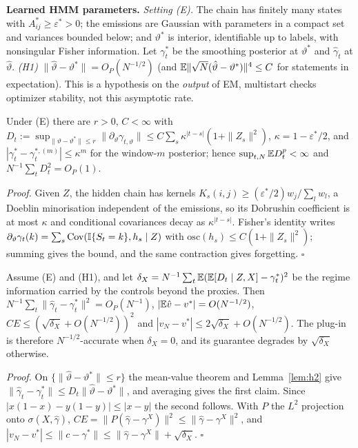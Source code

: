 \textbf{Learned HMM parameters.}
\emph{Setting (E).} The chain has finitely many states with $A^*_{ij}\ge\varepsilon^*>0$; the emissions are Gaussian with parameters in a compact set and variances bounded below; and $\vartheta^*$ is interior, identifiable up to labels, with nonsingular Fisher information. Let $\gamma^*_t$ be the smoothing posterior at $\vartheta^*$ and $\hat\gamma_t$ at $\hat\vartheta$. \emph{(H1)} $\|\hat\vartheta-\vartheta^*\|=O_P(N^{-1/2})$ (and $\mathbb{E}\|\sqrt N(\hat\vartheta-\vartheta^*)\|^4\le C$ for statements in expectation). This is a hypothesis on the \emph{output} of EM, multistart checks optimizer stability, not this asymptotic rate.
\begin{lemma}\label{lem:h2}
Under (E) there are $r>0$, $C<\infty$ with $D_t:=\sup_{\|\vartheta-\vartheta^*\|\le r}\|\partial_\vartheta\gamma_{t,\vartheta}\|\le C\sum_s\kappa^{|t-s|}(1+\|Z_s\|^2)$, $\kappa=1-\varepsilon^*/2$, and $|\gamma^*_t-\gamma^{*,(m)}_t|\le\kappa^m$ for the window-$m$ posterior; hence $\sup_{t,N}\mathbb{E} D_t^p<\infty$ and $N^{-1}\sum_tD_t^2=O_P(1)$.
\end{lemma}
\emph{Proof.} Given $Z$, the hidden chain has kernels $K_s(i,j)\ge(\varepsilon^*/2)w_j/\sum_lw_l$, a Doeblin minorisation independent of the emissions, so its Dobrushin coefficient is at most $\kappa$ and conditional covariances decay as $\kappa^{|t-s|}$. Fisher's identity writes $\partial_\vartheta\gamma_t(k)=\sum_s\mathrm{Cov}(\mathbb{I}\{S_t=k\},h_s\mid Z)$ with $\mathrm{osc}(h_s)\le C(1+\|Z_s\|^2)$; summing gives the bound, and the same contraction gives forgetting. $\square$
\begin{proposition}\label{prop:rate}
Assume (E) and (H1), and let $\delta_X=N^{-1}\sum_t\mathbb{E}(\mathbb{E}[D_t\mid Z,X]-\gamma^*_t)^2$ be the regime information carried by the controls beyond the proxies. Then $N^{-1}\sum_t\|\hat\gamma_t-\gamma^*_t\|^2=O_P(N^{-1})$, $|\mathbb{E}\hat v-v^*|=O(N^{-1/2})$, $CE\le(\sqrt{\delta_X}+O(N^{-1/2}))^2$ and $|v_N-v^*|\le2\sqrt{\delta_X}+O(N^{-1/2})$. The plug-in is therefore $N^{-1/2}$-accurate when $\delta_X=0$, and its guarantee degrades by $\sqrt{\delta_X}$ otherwise.
\end{proposition}
\emph{Proof.} On $\{\|\hat\vartheta-\vartheta^*\|\le r\}$ the mean-value theorem and Lemma~\ref{lem:h2} give $\|\hat\gamma_t-\gamma^*_t\|\le D_t\|\hat\vartheta-\vartheta^*\|$, and averaging gives the first claim. Since $|x(1-x)-y(1-y)|\le|x-y|$ the second follows. With $P$ the $L^2$ projection onto $\sigma(X,\hat\gamma)$, $CE=\|P(\hat\gamma-\gamma^X)\|^2\le\|\hat\gamma-\gamma^X\|^2$, and $|v_N-v^*|\le\|c-\gamma^*\|\le\|\hat\gamma-\gamma^X\|+\sqrt{\delta_X}$. $\square$
